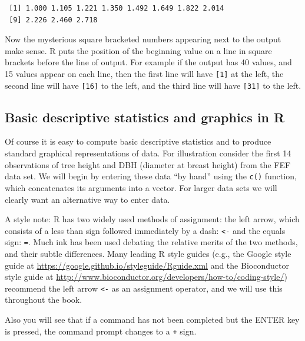 \documentclass[]{krantz}
\begin{document}
\begin{verbatim}
 [1] 1.000 1.105 1.221 1.350 1.492 1.649 1.822 2.014
 [9] 2.226 2.460 2.718
\end{verbatim}

Now the mysterious square bracketed numbers appearing next to the output make sense. R puts the position of the beginning value on a line in square brackets before the line of output. For example if the output has 40 values, and 15 values appear on each line, then the first line will have \texttt{{[}1{]}} at the left, the second line will have \texttt{{[}16{]}} to the left, and the third line will have \texttt{{[}31{]}} to the left.

\hypertarget{sec:dec}{%
\subsection{Basic descriptive statistics and graphics in R}\label{sec:dec}}

Of course it is easy to compute basic descriptive statistics and to produce standard graphical representations of data. For illustration consider the first 14 observations of tree height and DBH (diameter at breast height) from the FEF data set. We will begin by entering these data ``by hand'' using the \texttt{c()} function, which concatenates its arguments into a vector. For larger data sets we will clearly want an alternative way to enter data.

A style note: R has two widely used methods of assignment: the left arrow, which consists of a less than sign followed immediately by a dash: \texttt{\textless{}-} and the equals sign: \texttt{=}. Much ink has been used debating the relative merits of the two methods, and their subtle differences. Many leading R style guides (e.g., the Google style guide at \url{https://google.github.io/styleguide/Rguide.xml} and the Bioconductor style guide at \url{http://www.bioconductor.org/developers/how-to/coding-style/}) recommend the left arrow \texttt{\textless{}-} as an assignment operator, and we will use this throughout the book.

Also you will see that if a command has not been completed but the ENTER key is pressed, the command prompt changes to a \texttt{+} sign.
\end{document}
